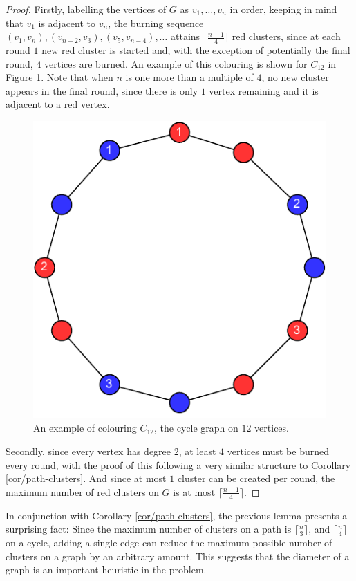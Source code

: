 \documentclass{mpaper}
\begin{document}
\begin{proof}
  Firstly, labelling the vertices of $G$ as $v_1, \dots, v_n$ in order, keeping in mind that $v_1$ is adjacent to $v_n$, the burning sequence $(v_1, v_n), (v_{n-2}, v_3), (v_5, v_{n-4}), \dots$ attains $\lceil \frac{n-1}{4} \rceil$ red clusters, since at each round $1$ new red cluster is started and, with the exception of potentially the final round, $4$ vertices are burned. An example of this colouring is shown for $C_12$ in Figure \ref{fig/cycle-colouring}. Note that when $n$ is one more than a multiple of $4$, no new cluster appears in the final round, since there is only $1$ vertex remaining and it is adjacent to a red vertex.

\begin{figure}
    \centering
    \includegraphics[scale=0.5]{mpaper/figures/CycleColouring.pdf}
    \caption{An example of colouring $C_{12}$, the cycle graph on $12$ vertices.}
    \label{fig/cycle-colouring}
\end{figure}
  Secondly, since every vertex has degree $2$, at least $4$ vertices must be burned every round, with the proof of this following a very similar structure to Corollary \ref{cor/path-clusters}. And since at most $1$ cluster can be created per round, the maximum number of red clusters on $G$ is at most $\lceil \frac{n-1}{4} \rceil$.
\end{proof}

In conjunction with Corollary \ref{cor/path-clusters}, the previous lemma presents a surprising fact: Since the maximum number of clusters on a path is $\lceil \frac{n}{3} \rceil$, and $\lceil \frac{n}{4}\rceil$ on a cycle, adding a single edge can reduce the maximum possible number of clusters on a graph by an arbitrary amount. This suggests that the diameter of a graph is an important heuristic in the \maxcluster problem.
\end{document}
